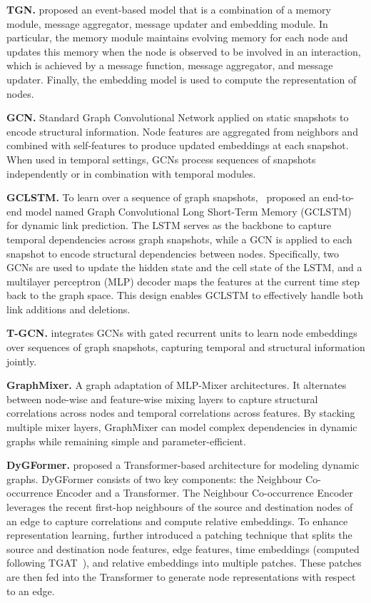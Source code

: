 \textbf{TGN.} \cite{tgn} proposed an event-based model that is a combination of a memory module, message aggregator, message updater and embedding module. In particular, the memory module maintains evolving memory for each node and updates this memory when the node is observed to be involved in an interaction, which is achieved by a message function, message aggregator, and message updater. Finally, the embedding model is used to compute the representation of nodes.

\textbf{GCN.}\citep{gcn} Standard Graph Convolutional Network applied on static snapshots to encode structural information. Node features are aggregated from neighbors and combined with self-features to produce updated embeddings at each snapshot. When used in temporal settings, GCNs process sequences of snapshots independently or in combination with temporal modules.

\textbf{GCLSTM.} To learn over a sequence of graph snapshots,~\cite{gclstm} proposed an end-to-end model named Graph Convolutional Long Short-Term Memory (GCLSTM) for dynamic link prediction. The LSTM serves as the backbone to capture temporal dependencies across graph snapshots, while a GCN is applied to each snapshot to encode structural dependencies between nodes. Specifically, two GCNs are used to update the hidden state and the cell state of the LSTM, and a multilayer perceptron (MLP) decoder maps the features at the current time step back to the graph space. This design enables GCLSTM to effectively handle both link additions and deletions.

\textbf{T-GCN.} \cite{t-gcn} integrates GCNs with gated recurrent units to learn node embeddings over sequences of graph snapshots, capturing temporal and structural information jointly.


\textbf{GraphMixer.} \citep{graphmixer} A graph adaptation of MLP-Mixer architectures. It alternates between node-wise and feature-wise mixing layers to capture structural correlations across nodes and temporal correlations across features. By stacking multiple mixer layers, GraphMixer can model complex dependencies in dynamic graphs while remaining simple and parameter-efficient.

\textbf{DyGFormer.} \cite{dygfomer} proposed a Transformer-based architecture for modeling dynamic graphs. DyGFormer consists of two key components: the Neighbour Co-occurrence Encoder and a Transformer. The Neighbour Co-occurrence Encoder leverages the recent first-hop neighbours of the source and destination nodes of an edge to capture correlations and compute relative embeddings. To enhance representation learning, \cite{dygfomer} further introduced a patching technique that splits the source and destination node features, edge features, time embeddings (computed following TGAT~\citep{tgat}), and relative embeddings into multiple patches. These patches are then fed into the Transformer to generate node representations with respect to an edge.

